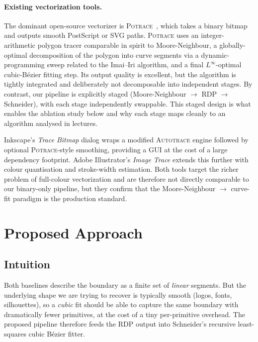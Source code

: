 \documentclass[twocolumn,a4paper,10pt]{article}
\begin{document}
\paragraph*{Existing vectorization tools.}
The dominant open-source vectorizer is \textsc{Potrace}~\cite{selinger2003},
which takes a binary bitmap and outputs smooth PostScript or SVG paths.
\textsc{Potrace} uses an integer-arithmetic polygon tracer comparable
in spirit to Moore-Neighbour, a globally-optimal decomposition of the
polygon into curve segments via a dynamic-programming sweep related to
the Imai--Iri algorithm, and a final $L^\infty$-optimal cubic-B\'ezier
fitting step.  Its output quality is excellent, but the algorithm is
tightly integrated and deliberately not decomposable into independent
stages.  By contrast, our pipeline is explicitly staged (Moore-Neighbour
$\to$ RDP $\to$ Schneider), with each stage independently swappable.
This staged design is what enables the ablation study below and why
each stage maps cleanly to an algorithm analysed in lectures.

Inkscape's \emph{Trace Bitmap} dialog wraps a modified
\textsc{Autotrace} engine followed by optional \textsc{Potrace}-style
smoothing, providing a GUI at the cost of a large dependency footprint.
Adobe Illustrator's \emph{Image Trace} extends this further with
colour quantisation and stroke-width estimation.  Both tools target the
richer problem of full-colour vectorization and are therefore not
directly comparable to our binary-only pipeline, but they confirm that
the Moore-Neighbour $\to$ curve-fit paradigm is the production standard.

\section{Proposed Approach}
\label{sec:proposed}

\subsection{Intuition}
Both baselines describe the boundary as a finite set of \emph{linear}
segments.  But the underlying shape we are trying to recover is
typically smooth (logos, fonts, silhouettes), so a \emph{cubic} fit
should be able to capture the same boundary with dramatically fewer
primitives, at the cost of a tiny per-primitive overhead.  The
proposed pipeline therefore feeds the RDP output into Schneider's
recursive least-squares cubic B\'ezier fitter.
\end{document}
